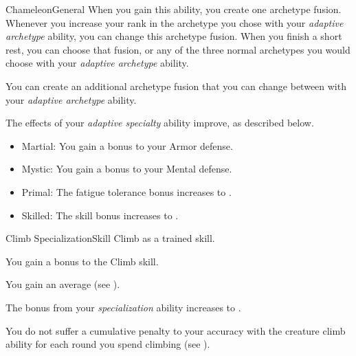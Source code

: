 \begin{feat}{Chameleon}{General}
    When you gain this ability, you create one archetype fusion.
    Whenever you increase your rank in the archetype you chose with your \textit{adaptive archetype} ability, you can change this archetype fusion.
    When you finish a short rest, you can choose that fusion, or any of the three normal archetypes you would choose with your \textit{adaptive archetype} ability.

     You can create an additional archetype fusion that you can change between with your \textit{adaptive archetype} ability.

     The effects of your \textit{adaptive specialty} ability improve, as described below.
    \begin{itemize}
      \item Martial: You gain a  bonus to your Armor defense.
      \item Mystic: You gain a  bonus to your Mental defense.
      \item Primal: The fatigue tolerance bonus increases to .
      \item Skilled: The skill bonus increases to .
    \end{itemize}
  \end{feat}

  \begin{feat}{Climb Specialization}{Skill}
    \featpre Climb as a trained skill.

     You gain a  bonus to the Climb skill.

     You gain an average  (see ).

     The bonus from your \textit{specialization} ability increases to .

     You do not suffer a cumulative  penalty to your accuracy with the creature climb ability for each round you spend climbing (see ).
  \end{feat}

